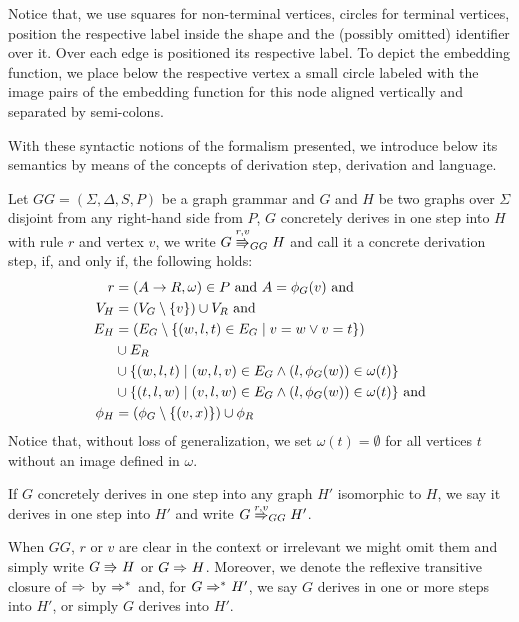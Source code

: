 \documentclass[]{report}
\begin{document}


Notice that, we use squares for non-terminal vertices, circles for terminal vertices, position the respective label inside the shape and the (possibly omitted) identifier over it. Over each edge is positioned its respective label. To depict the embedding function, we place below the respective vertex a small circle labeled with the image pairs of the embedding function for this node aligned vertically and separated by semi-colons.


With these syntactic notions of the formalism presented, we introduce below its semantics by means of the concepts of derivation step, derivation and language.

\begin{definition}
	\label{def:gg_dstep}
	Let $GG = (\Sigma, \Delta, S, P)$ be a graph grammar and $G$ and $H$ be two graphs over $\Sigma$ disjoint from any right-hand side from $P$, $G$ concretely derives in one step into $H$ with rule $r$ and vertex $v$, we write $G \cderiv{r}{v}{GG} H$ and call it a concrete derivation step, if, and only if, the following holds:
	\begin{align*}
		r & = (A \to R, \omega) \in P \text{ and } A = \phi_G(v) \text{ and} \\
		V_H  & = (V_G \setminus \{v\}) \cup V_R \text{ and} \\
		E_H & = (E_G \setminus \{(w,l,t) \in E_G \; | \; v = w \lor v = t\}) \\
		& \cup E_R \\
		& \cup \{(w,l,t) \; | \; (w,l,v) \in E_G \land (l,\phi_G(w)) \in \omega(t)\} \\
		& \cup \{(t,l,w) \; | \; (v,l,w) \in E_G \land (l,\phi_G(w)) \in \omega(t)\} \text{ and} \\
		\phi_H & = (\phi_G \setminus \{(v,x)\}) \cup \phi_R
	\end{align*}
	Notice that, without loss of generalization, we set $\omega(t) = \emptyset$ for all vertices $t$ without an image defined in $\omega$.
	
	If $G$ concretely derives in one step into any graph $H'$ isomorphic to $H$, we say it derives in one step into $H'$ and write $G \deriv{r}{v}{GG} H'$. 
	
	When $GG$, $r$ or $v$ are clear in the context or irrelevant we might omit them and simply write $G \cderiv{}{}{} H$ or $G \deriv{}{}{} H$. Moreover, we denote the reflexive transitive closure of $\deriv{}{}{}$ by $\derivtr{}{}{}$ and, for $G \derivtr{}{}{} H'$, we say $G$ derives in one or more steps into $H'$, or simply $G$ derives into $H'$.
\end{definition}
\end{document}
